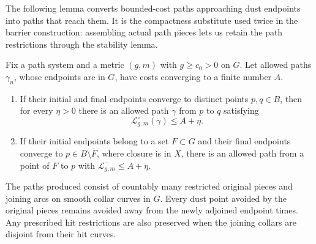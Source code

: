 The following lemma converts bounded-cost paths approaching dust
endpoints into paths that reach them.  It is the compactness substitute
used twice in the barrier construction: assembling actual path pieces
lets us retain the path restrictions through the stability lemma.

\begin{lemma}\label{lem:collar-splicing}
Fix a path system and a metric $(g,m)$ with $g\ge c_0>0$ on $G$.
Let allowed paths $\gamma_n$, whose endpoints are in $G$, have costs
converging to a finite number $A$.
\begin{enumerate}[label=\textup{(\roman*)}]
\item If their initial and final endpoints converge to distinct points
$p,q\in B$, then for every $\eta>0$ there is an allowed path $\gamma$
from $p$ to $q$ satisfying
\[
 \mathcal L^\circ_{g,m}(\gamma)\le A+\eta.
\]
\item If their initial endpoints belong to a set $F\subset G$ and
their final endpoints converge to $p\in B\setminus\overline F$,
where closure is in $X$, there is an allowed path from a point of $F$
to $p$ with $\mathcal L^-_{g,m}\le A+\eta$.
\end{enumerate}
The paths produced consist of countably many restricted original
pieces and joining arcs on smooth collar curves in $G$.  Every dust
point avoided by the original pieces remains avoided away from the
newly adjoined endpoint times.
Any prescribed hit restrictions are also preserved when the joining
collars are disjoint from their hit curves.
\end{lemma}

